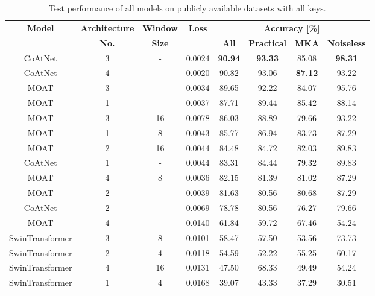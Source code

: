 \documentclass[a4paper,11pt,twoside]{report}
\theoremstyle{definition}
\begin{document}
\begin{table}[h!]
\centering
\caption{Test performance of all models on publicly available datasets with all keys.}
\begin{adjustbox}{max width=\textwidth}
\begin{tabular}{c|c|c|c|cccc}
\hline
\textbf{Model} & \textbf{Architecture} & \textbf{Window} & \textbf{Loss} & \multicolumn{4}{c}{\textbf{Accuracy [\%]}} \\
\cline{5-8}
       &   \textbf{No.}  & \textbf{Size}&        & \textbf{All} & \textbf{Practical} & \textbf{MKA} & \textbf{Noiseless}  \\
\hline
CoAtNet & 3 & - & 0.0024 & \textbf{90.94} & \textbf{93.33} & 85.08 & \textbf{98.31}  \\
CoAtNet & 4 & - & 0.0020 & 90.82 & 93.06 & \textbf{87.12} & 93.22  \\
MOAT & 3 & - & 0.0034 & 89.65 & 92.22 & 84.07 & 95.76  \\
MOAT & 1 & - & 0.0037 & 87.71 & 89.44 & 85.42 & 88.14  \\
MOAT & 3 & 16 & 0.0078 & 86.03 & 88.89 & 79.66 & 93.22  \\
MOAT & 1 & 8 & 0.0043 & 85.77 & 86.94 & 83.73 & 87.29  \\
MOAT & 2 & 16 & 0.0044 & 84.48 & 84.72 & 82.03 & 89.83  \\
CoAtNet & 1 & - & 0.0044 & 83.31 & 84.44 & 79.32 & 89.83  \\
MOAT & 4 & 8 & 0.0036 & 82.15 & 81.39 & 81.02 & 87.29 \\
MOAT & 2 & - & 0.0039 & 81.63 & 80.56 & 80.68 & 87.29 \\
CoAtNet & 2 & - & 0.0069 & 78.78 & 80.56 & 76.27 & 79.66  \\
MOAT & 4 & - & 0.0140 & 61.84 & 59.72 & 67.46 & 54.24  \\
SwinTransformer & 3 & 8 & 0.0101 & 58.47 & 57.50 & 53.56 & 73.73  \\
SwinTransformer & 2 & 4 & 0.0118 & 54.59 & 52.22 & 55.25 & 60.17  \\
SwinTransformer & 4 & 16 & 0.0131 & 47.50 & 68.33 & 49.49 & 54.24  \\
SwinTransformer & 1 & 4 & 0.0168 & 39.07 & 43.33 & 37.29 & 30.51  \\
\hline
\end{tabular}
\end{adjustbox}
\label{tab:all_keys_clean_results}
\end{table}
\end{document}
